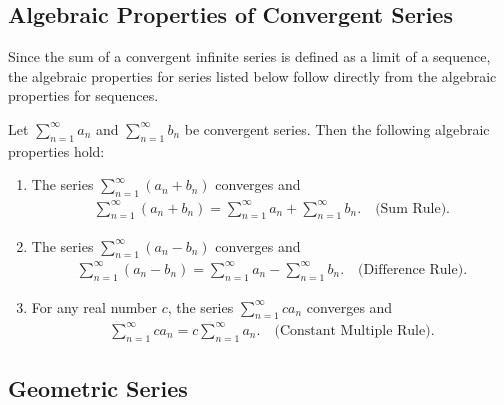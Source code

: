 \documentclass{report}
\begin{document}
    \subsection*{Algebraic Properties of Convergent Series}
    \bigbreak \noindent 
    Since the sum of a convergent infinite series is defined as a limit of a sequence, the algebraic properties for series listed below follow directly from the algebraic properties for sequences.
    \bigbreak \noindent 
    \begin{thrm}
        Let $ \sum_{n=1}^{\infty} a_n$ and $\sum_{n=1}^{\infty} b_n$ be convergent series. Then the following algebraic properties hold:
        \begin{enumerate}
            \item The series 
            $\sum_{n=1}^{\infty} (a_n + b_n)$ converges and 
            \begin{align*}
                \sum_{n=1}^{\infty} (a_n + b_n) = \sum_{n=1}^{\infty} a_n + \sum_{n=1}^{\infty} b_n. \quad \text{(Sum Rule)}
            .\end{align*}
            \item The series $\sum_{n=1}^{\infty} (a_n - b_n)$ converges and 
                \begin{align*}
                    \sum_{n=1}^{\infty} (a_n - b_n) = \sum_{n=1}^{\infty} a_n - \sum_{n=1}^{\infty} b_n. \quad \text{(Difference Rule)}
                .\end{align*}
            \item For any real number \( c \), the series $\sum_{n=1}^{\infty} c a_n$ converges and 
                \begin{align*}
                    \sum_{n=1}^{\infty} c a_n = c \sum_{n=1}^{\infty} a_n. \quad \text{(Constant Multiple Rule)}
                .\end{align*}
        \end{enumerate}
    \end{thrm}

    \bigbreak \noindent 
    \subsection*{Geometric Series}
    \bigbreak {}
    






 


    

    



  

    

    

      


      


      

      

    





    
\end{document}
